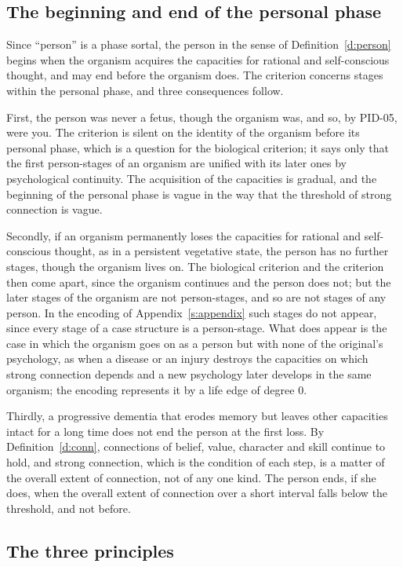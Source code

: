 \documentclass{situationist-preprint}
\begin{document}
\subsection{The beginning and end of the personal phase}

Since \enquote{person} is a phase sortal, the person in the sense of Definition~\ref{d:person} begins when the organism acquires the capacities for rational and self-conscious thought, and may end before the organism does. The criterion concerns stages within the personal phase, and three consequences follow.

First, the person was never a fetus, though the organism was, and so, by PID-05, were you. The criterion is silent on the identity of the organism before its personal phase, which is a question for the biological criterion; it says only that the first person-stages of an organism are unified with its later ones by psychological continuity. The acquisition of the capacities is gradual, and the beginning of the personal phase is vague in the way that the threshold of strong connection is vague.

Secondly, if an organism permanently loses the capacities for rational and self-conscious thought, as in a persistent vegetative state, the person has no further stages, though the organism lives on. The biological criterion and the criterion then come apart, since the organism continues and the person does not; but the later stages of the organism are not person-stages, and so are not stages of any person. In the encoding of Appendix~\ref{s:appendix} such stages do not appear, since every stage of a case structure is a person-stage. What does appear is the case in which the organism goes on as a person but with none of the original's psychology, as when a disease or an injury destroys the capacities on which strong connection depends and a new psychology later develops in the same organism; the encoding represents it by a life edge of degree $0$.

Thirdly, a progressive dementia that erodes memory but leaves other capacities intact for a long time does not end the person at the first loss. By Definition~\ref{d:conn}, connections of belief, value, character and skill continue to hold, and strong connection, which is the condition of each step, is a matter of the overall extent of connection, not of any one kind. The person ends, if she does, when the overall extent of connection over a short interval falls below the threshold, and not before.

\subsection{The three principles}
\end{document}
